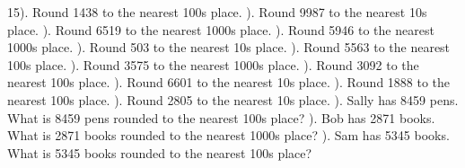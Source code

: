\documentclass{article}%
\begin{document}
15). Round 1438 to the nearest 100s place.%
\newline%
\newline%
). Round 9987 to the nearest 10s place.%
\newline%
\newline%
). Round 6519 to the nearest 1000s place.%
\newline%
\newline%
). Round 5946 to the nearest 1000s place.%
\newline%
\newline%
). Round 503 to the nearest 10s place.%
\newline%
\newline%
). Round 5563 to the nearest 100s place.%
\newline%
\newline%
). Round 3575 to the nearest 1000s place.%
\newline%
\newline%
). Round 3092 to the nearest 100s place.%
\newline%
\newline%
). Round 6601 to the nearest 10s place.%
\newline%
\newline%
). Round 1888 to the nearest 100s place.%
\newline%
\newline%
). Round 2805 to the nearest 10s place.%
\newline%
\newline%
). Sally has 8459 pens. What is 8459 pens rounded to the nearest 100s place?%
\newline%
\newline%
). Bob has 2871 books. What is 2871 books rounded to the nearest 1000s place?%
\newline%
\newline%
). Sam has 5345 books. What is 5345 books rounded to the nearest 100s place?%
\end{document}
